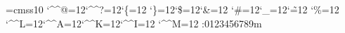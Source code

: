 \font\THFa=cmss10
\begingroup
\catcode`\^^@=12\catcode`\^^?=12\catcode`\{=12
\catcode`\}=12\catcode`\$=12\catcode`\&=12
\catcode`\#=12\catcode`\_=12\catcode`\~=12
\catcode`\%=12
\catcode`\^^L=12\catcode`\^^A=12\catcode`\^^K=12\catcode`\^^I=12
\catcode`\^^M=12
\THFa:0123456789m\endinclude\endgroup
